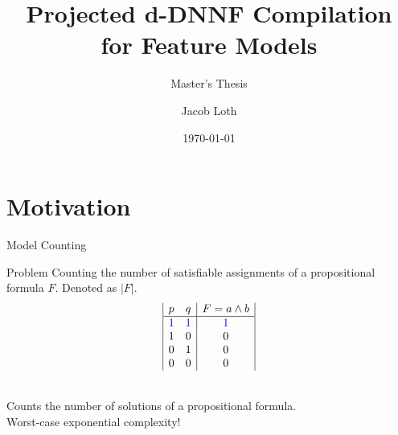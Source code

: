 \documentclass[
	aspectratio=169, %
	8pt, %
]{beamer}
\title[Projected d-DNNF Compilation]{Projected d-DNNF Compilation for Feature Models} %
\subtitle{Master's Thesis} %
\author[Jacob Loth]{Jacob Loth} %
\date{\today} %
\begin{document}
\maketitle %

\section{Motivation}
\begin{frame}{Model Counting}

\begin{block}{Problem}
Counting the number of satisfiable assignments of a propositional formula $F$. Denoted as $|F|$.
\vspace{0.5cm}
\begin{displaymath}
    \begin{array}{|c c|c|}
    p & q & F=a \land b\\ %
    \hline %
    \color{blue}1 & \color{blue}1 & \color{blue}1\\
    1 & 0 & 0\\
    0 & 1 & 0\\
    0 & 0 & 0\\
    \end{array}
    \end{displaymath}

\end{block}
\centering
{}\\
Counts the number of solutions of a propositional formula. \\
Worst-case exponential complexity!
\end{frame}
\end{document}
